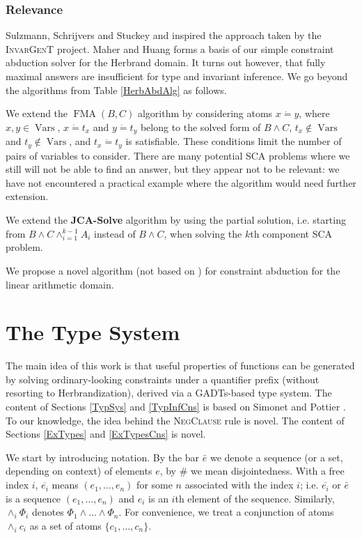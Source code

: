 \documentclass{article}
\newcommand{\nin}{\not\in}
\newcommand{\tmname}[1]{\textsc{#1}}
\newcommand{\tmop}[1]{\ensuremath{\operatorname{#1}}}
\newcommand{\tmstrong}[1]{\textbf{#1}}
\begin{document}
\subsection{Relevance}

Sulzmann, Schrijvers and Stuckey {\cite{SulzmannAbdGADTs}} and
{\cite{AbdEADTs}} inspired the approach taken by the {\tmname{InvarGenT}}
project. Maher and Huang {\cite{AbductionSolvMaher}} forms a basis of our
simple constraint abduction solver for the Herbrand domain. It turns out
however, that fully maximal answers are insufficient for type and invariant
inference. We go beyond the algorithms from Table \ref{HerbAbdAlg} as follows.

We extend the $\tmop{FMA} (B, C)$ algorithm by considering atoms $x \dot{=}
y$, where $x, y \in \tmop{Vars}$, $x \dot{=} t_x$ and $y \dot{=} t_y$ belong
to the solved form of $B \wedge C$, $t_x \nin \tmop{Vars}$ and $t_y \nin
\tmop{Vars}$, and $t_x \dot{=} t_y$ is satisfiable. These conditions limit the
number of pairs of variables to consider. There are many potential SCA
problems where we still will not be able to find an answer, but they appear
not to be relevant: we have not encountered a practical example where the
algorithm would need further extension.

We extend the {\tmstrong{JCA-Solve}} algorithm by using the partial solution,
i.e. starting from $B \wedge C \wedge_{i = 1}^{k - 1} A_i$ instead of $B
\wedge C$, when solving the $k$th component SCA problem.

We propose a novel algorithm (not based on {\cite{AbductionLinArithMaher}})
for constraint abduction for the linear arithmetic domain.{\newpage}

\chapter{The Type System}

The main idea of this work is that useful properties of functions can be
generated by solving ordinary-looking constraints under a quantifier prefix
(without resorting to Herbrandization), derived via a GADTs-based type system.
The content of Sections \ref{TypSys} and \ref{TypInfCns} is based on Simonet
and Pottier {\cite{simonet-pottier-hmg-toplas}}. To our knowledge, the idea
behind the {\tmname{NegClause}} rule is novel. The content of Sections
\ref{ExTypes} and \ref{ExTypesCns} is novel.

We start by introducing notation. By the bar $\bar{e}$ we denote a sequence
(or a set, depending on context) of elements $e$, by $\#$ we mean
disjointedness. With a free index $i$, $\overline{e_i}$ means $(e_1, \ldots,
e_n)$ for some $n$ associated with the index $i$; i.e. $\overline{e_i}$ or
$\bar{e}$ is a sequence $(e_1, \ldots, e_n)$ and $e_i$ is an $i$th element of
the sequence. Similarly, $\wedge_i \Phi_i$ denotes $\Phi_1 \wedge \ldots
\wedge \Phi_n$. For convenience, we treat a conjunction of atoms $\wedge_i
c_i$ as a set of atoms $\{ c_1, \ldots, c_n \}$.
\end{document}
